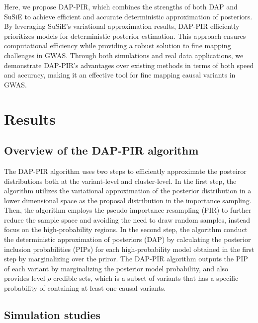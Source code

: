 \documentclass[pdflatex,sn-mathphys-num]{sn-jnl}%
\theoremstyle{thmstyleone}%
\theoremstyle{thmstyletwo}%
\theoremstyle{thmstylethree}%
\begin{document}
Here, we propose DAP-PIR, which combines the strengths of both DAP and SuSiE to achieve efficient and accurate deterministic approximation of posteriors. By leveraging SuSiE's variational approximation results, DAP-PIR efficiently prioritizes models for deterministic posterior estimation. This approach ensures computational efficiency while providing a robust solution to fine mapping challenges in GWAS. Through both simulations and real data applications, we demonstrate DAP-PIR’s advantages over existing methods in terms of both speed and accuracy, making it an effective tool for fine mapping causal variants in GWAS.



\section{Results}\label{sec2}
\subsection{Overview of the DAP-PIR algorithm}\label{subsec1}
The DAP-PIR algorithm uses two steps to efficiently approximate the posteiror distributions both at the variant-level and cluster-level. In the first step, the algorithm utilizes the variational approximation of the posterior distribution in a lower dimensional space as the proposal distribution in the importance sampling. Then, the algorithm employs the pseudo importance resampling (PIR) to further reduce the sample space and avoiding the need to draw random samples, instead focus on the high-probability regions. In the second step, the algorithm conduct the deterministic approximation of posteriors (DAP) by calculating the posterior inclusion probabilities (PIPs) for each high-probability model obtained in the first step by marginalizing over the priror. The DAP-PIR algorithm outputs the PIP of each variant by marginalizing the posterior model probability, and also provides level-$\rho$ credible sets, which is a subset of variants that has a specific probability of containing at least one causal variants.





\subsection{Simulation studies}\label{subsec3}
\end{document}

